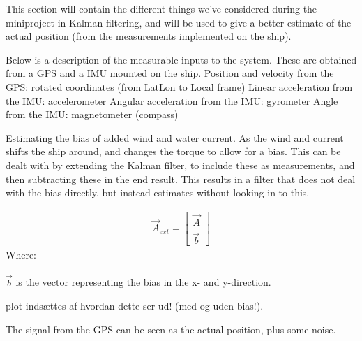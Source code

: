 This section will contain the different things we've considered during the miniproject in Kalman filtering, and will be used to give a better estimate of the actual position (from the measurements implemented on the ship).

Below is a description of the measurable inputs to the system. These are obtained from a \ac{GPS} and a \ac{IMU} mounted on the ship.
Position and velocity from the \ac{GPS}: rotated coordinates (from LatLon to Local frame)
Linear acceleration from the \ac{IMU}: accelerometer
Angular acceleration from the \ac{IMU}: gyrometer
Angle from the \ac{IMU}: magnetometer (compass)

Estimating the bias of added wind and water current. As the wind and current shifts the ship around, and changes the torque to allow for a bias. This can be dealt with by extending the Kalman filter, to include these as measurements, and then subtracting these in the end result. This results in a filter that does not deal with the bias directly, but instead estimates without looking in to this. 

\begin{align}
\vec{A}_{ext} = \begin{bmatrix}
\vec{A}\\
\bar{\vec{b}}
\end{bmatrix}
\end{align}
\noindent Where:
\begin{ffk}
$\bar{\vec{b}}$ is the vector representing the bias in the x- and y-direction. 
\end{ffk}

\MATLAB plot indsættes af hvordan dette ser ud! (med og uden bias!).

The signal from the GPS can be seen as the actual position, plus some noise. 

